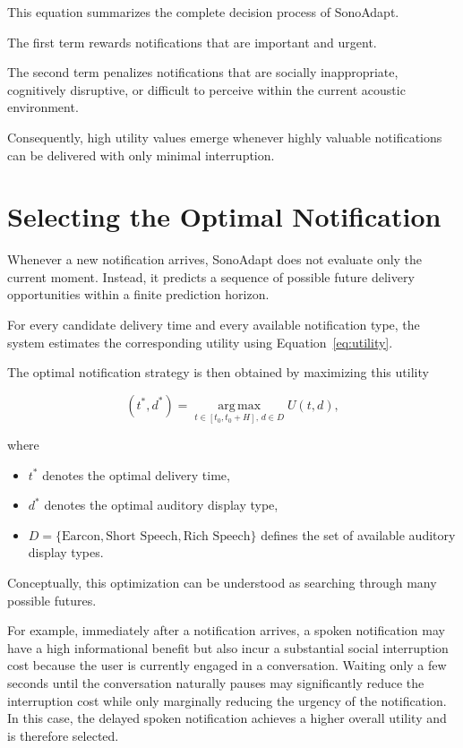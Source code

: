 This equation summarizes the complete decision process of SonoAdapt.

The first term rewards notifications that are important and urgent.

The second term penalizes notifications that are socially inappropriate, cognitively disruptive, or difficult to perceive within the current acoustic environment.

Consequently, high utility values emerge whenever highly valuable notifications can be delivered with only minimal interruption.


\section{Selecting the Optimal Notification}

Whenever a new notification arrives, SonoAdapt does not evaluate only the current moment. Instead, it predicts a sequence of possible future delivery opportunities within a finite prediction horizon.

For every candidate delivery time and every available notification type, the system estimates the corresponding utility using Equation~\ref{eq:utility}.

The optimal notification strategy is then obtained by maximizing this utility

\begin{equation}
(t^*,d^*)
=
\operatorname*{arg\,max}_{t\in[t_0,t_0+H],\,d\in D}
U(t,d),
\label{eq:optimization}
\end{equation}

where

\begin{itemize}
\item $t^*$ denotes the optimal delivery time,
\item $d^*$ denotes the optimal auditory display type,
\item $D = \{\text{Earcon}, \text{Short Speech}, \text{Rich Speech}\}$ defines the set of available auditory display types.
\end{itemize}

Conceptually, this optimization can be understood as searching through many possible futures.

For example, immediately after a notification arrives, a spoken notification may have a high informational benefit but also incur a substantial social interruption cost because the user is currently engaged in a conversation. Waiting only a few seconds until the conversation naturally pauses may significantly reduce the interruption cost while only marginally reducing the urgency of the notification. In this case, the delayed spoken notification achieves a higher overall utility and is therefore selected.

